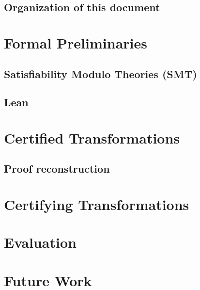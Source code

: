 \documentclass[
	msc,
	english
]{ppgccufmg}
\begin{document}
	  \section{Organization of this document}
	    
	\chapter{Formal Preliminaries}\label{chap:formalPrelim}
      \section{Satisfiability Modulo Theories (SMT)}\label{sec:smt}
        
    \section{Lean}
        
    \chapter{Certified Transformations}\label{chap:certified}
    
      \section{Proof reconstruction}\label{sec:certified_rcons}
        
    \chapter{Certifying Transformations}\label{chap:rcons}
        
	\chapter{Evaluation}\label{chap:eval}
      
	\chapter{Future Work}\label{chap:future}
      
\end{document}
